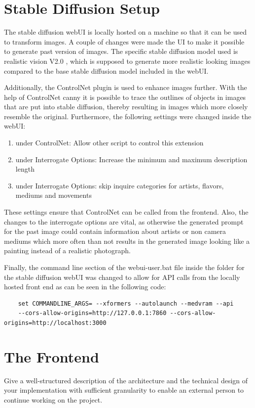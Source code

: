 \documentclass[english,notitlepage,smartquotes]{hgbreport}
\begin{document}
\section{Stable Diffusion Setup}
The stable diffusion webUI \cite{webui} is locally hosted on a machine so that it can be used to transform images. A couple of changes were made the UI to make it possible to generate past version of images.
The specific stable diffusion model used is realistic vision V2.0 \cite{realisticVision}, which is supposed to generate more realistic looking images compared to the base stable diffusion model included in the webUI.

Additionally, the ControlNet plugin \cite{controllNet} is used to enhance images further. With the help of ControlNet canny it is possible to trace the outlines of objects in images that are put into stable diffusion, thereby resulting in images which more closely resemble the original.
Furthermore, the following settings were changed inside the webUI:
\begin{enumerate}
    \item under ControlNet: Allow other script to control this extension
    \item under Interrogate Options: Increase the minimum and maximum description length 
    \item under Interrogate Options: skip inquire categories for artists, flavors, mediums and movements 
\end{enumerate}
These settings ensure that ControlNet can be called from the frontend. Also, the changes to the interrogate options are vital, as otherwise the generated prompt for the past image could contain information about artists or non camera mediums which more often than not results in the generated image looking like a painting instead of a realistic photograph.

Finally, the command line section of the webui-user.bat file inside the folder for the stable diffusion webUI was changed to allow for API calls from the locally hosted front end as can be seen in the following code:

\begin{verbatim}
    set COMMANDLINE_ARGS= --xformers --autolaunch --medvram --api 
    --cors-allow-origins=http://127.0.0.1:7860 --cors-allow-origins=http://localhost:3000
\end{verbatim}

\section{The Frontend}
Give a well-structured description of the architecture and the technical design
of your implementation with sufficient granularity to enable an external person
to continue working on the project.
\end{document}
